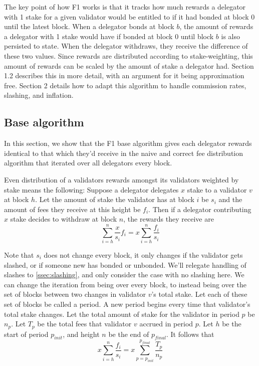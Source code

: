 \documentclass[]{article}
\begin{document}
The key point of how F1 works is that it tracks how much rewards a delegator with 1 stake for a given validator would be entitled to if it had bonded at block 0 until the latest block.
When a delegator bonds at block $b$, the amount of rewards a delegator with 1 stake would have if bonded at block 0 until block $b$ is also persisted to state.
When the delegator withdraws, they receive the difference of these two values.
Since rewards are distributed according to stake-weighting, this amount of rewards can be scaled by the amount of stake a delegator had.
Section 1.2 describes this in more detail, with an argument for it being approximation free. 
Section 2 details how to adapt this algorithm to handle commission rates, slashing, and inflation.

\subsection{Base algorithm}
In this section, we show that the F1 base algorithm gives each delegator rewards identical to that which they'd receive in the naive and correct fee distribution algorithm that iterated over all delegators every block.

Even distribution of a validators rewards amongst its validators weighted by stake means the following: 
Suppose a delegator delegates $x$ stake to a validator $v$ at block $h$.
Let the amount of stake the validator has at block $i$ be $s_i$ and the amount of fees they receive at this height be $f_i$.
Then if a delegator contributing $x$ stake decides to withdraw at block $n$, the rewards they receive are 
$$\sum_{i = h}^{n} \frac{x}{s_i}f_i = x \sum_{i = h}^{n} \frac{f_i}{s_i}$$

Note that $s_i$ does not change every block,
it only changes if the validator gets slashed, or if someone new has bonded or unbonded.
We'll relegate handling of slashes to \autoref{ssec:slashing}, and only consider the case with no slashing here.
We can change the iteration from being over every block, to instead being over the set of blocks between two changes in validator $v$'s total stake.
Let each of these set of blocks be called a period.
A new period begins every time that validator's total stake changes.
Let the total amount of stake for the validator in period $p$ be $n_p$.
Let $T_p$ be the total fees that validator $v$ accrued in period $p$.
Let $h$ be the start of period $p_{init}$, and height $n$ be the end of $p_{final}$.
It follows that 
$$x \sum_{i = h}^{n} \frac{f_i}{s_i} = x \sum_{p = p_{init}}^{p_{final}} \frac{T_p}{n_p}$$
\end{document}
